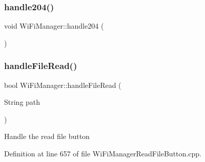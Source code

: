 \subsubsection{\texorpdfstring{handle204()}{handle204()}}
{\footnotesize\ttfamily void Wi\+Fi\+Manager\+::handle204 (\begin{DoxyParamCaption}{ }\end{DoxyParamCaption})\hspace{0.3cm}{\ttfamily [private]}}

\mbox{\label{class_wi_fi_manager_a9e802fa4ca834a622f058a7176f47806}} 
\subsubsection{\texorpdfstring{handle\+File\+Read()}{handleFileRead()}}
{\footnotesize\ttfamily bool Wi\+Fi\+Manager\+::handle\+File\+Read (\begin{DoxyParamCaption}\item[{String}]{path }\end{DoxyParamCaption})\hspace{0.3cm}{\ttfamily [private]}}

Handle the read file button 

Definition at line 657 of file Wi\+Fi\+Manager\+Read\+File\+Button.\+cpp.


